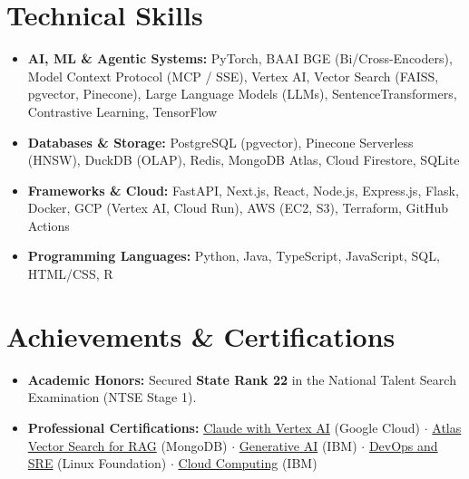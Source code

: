 \documentclass[10pt, a4paper]{article}
\begin{document}
\section*{Technical Skills}
\begin{itemize}
    \item \textbf{AI, ML \& Agentic Systems:} PyTorch, BAAI BGE (Bi/Cross-Encoders), Model Context Protocol (MCP / SSE), Vertex AI, Vector Search (FAISS, pgvector, Pinecone), Large Language Models (LLMs), SentenceTransformers, Contrastive Learning, TensorFlow
    \item \textbf{Databases \& Storage:} PostgreSQL (pgvector), Pinecone Serverless (HNSW), DuckDB (OLAP), Redis, MongoDB Atlas, Cloud Firestore, SQLite
    \item \textbf{Frameworks \& Cloud:} FastAPI, Next.js, React, Node.js, Express.js, Flask, Docker, GCP (Vertex AI, Cloud Run), AWS (EC2, S3), Terraform, GitHub Actions
    \item \textbf{Programming Languages:} Python, Java, TypeScript, JavaScript, SQL, HTML/CSS, R
\end{itemize}

\section*{Achievements \& Certifications}
\begin{itemize}
    \item \textbf{Academic Honors:} Secured \textbf{State Rank 22} in the National Talent Search Examination (NTSE Stage 1).
    \item \textbf{Professional Certifications:} \href{https://cloud.google.com/vertex-ai}{Claude with Vertex AI} (Google Cloud) $\cdot$ \href{https://learn.mongodb.com/c/7DQezDywQmOqalJQOWBBOg}{Atlas Vector Search for RAG} (MongoDB) $\cdot$ \href{https://courses.vit.skillsnetwork.site/certificates/a1992730519b41fbbe6ca9e2bdedd526}{Generative AI} (IBM) $\cdot$ \href{https://www.credly.com/badges/e2544aff-14c5-481d-9a11-4b98cb544ec2/public_url}{DevOps and SRE} (Linux Foundation) $\cdot$ \href{https://www.credly.com/badges/fb8bf992-f327-4d8b-9548-97cbb4f8a622/public_url}{Cloud Computing} (IBM)
\end{itemize}
\end{document}

